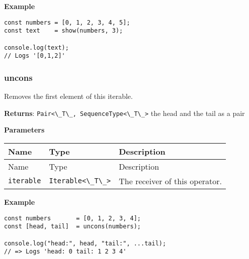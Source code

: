 \textbf{Example}

\begin{lstlisting}[label=7e589eab-b8b6-4efa-8f88-a1f246754972]
const numbers = [0, 1, 2, 3, 4, 5];
const text    = show(numbers, 3);
                                   
console.log(text);
// Logs '[0,1,2]'
\end{lstlisting}

\hypertarget{235974db-05c7-4513-8478-7d9ca31e50b4}{%
\subsubsection{uncons}\label{235974db-05c7-4513-8478-7d9ca31e50b4}}

Removes the first element of this iterable.

\textbf{Returns}:
\passthrough{\lstinline!Pair<\_T\_, SequenceType<\_T\_>!} the head and
the tail as a pair

\textbf{Parameters}

\begin{longtable}[]{
  >{\raggedright\arraybackslash}p{}
  >{\raggedright\arraybackslash}p{}
  >{\raggedright\arraybackslash}p{}@{}}

\toprule\noalign{}
Name & Type & Description \\
\midrule\noalign{}
\endfirsthead
\toprule\noalign{}
Name & Type & Description \\
\midrule\noalign{}
\endhead
\bottomrule\noalign{}
\endlastfoot
\passthrough{\lstinline!iterable!} &
\passthrough{\lstinline!Iterable<\_T\_>!} & The receiver of this
operator. \\
\end{longtable}

\textbf{Example}

\begin{lstlisting}[label=7a7b4acd-51a2-4d02-ba76-76bc89af2bfc]
const numbers       = [0, 1, 2, 3, 4];
const [head, tail]  = uncons(numbers);
                                             
console.log("head:", head, "tail:", ...tail);
// => Logs 'head: 0 tail: 1 2 3 4'
\end{lstlisting}

